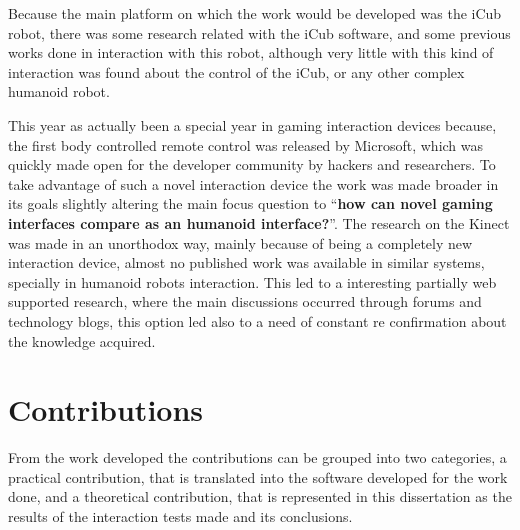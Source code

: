 	Because the main platform on which the work would be developed was the iCub robot, there was some research related with the iCub software, and some previous works done in interaction with this robot, although very little with this kind of interaction was found about the control of the iCub, or any other complex humanoid robot.

	This year as actually been a special year in gaming interaction devices because, the first body controlled remote control was released by Microsoft, which was quickly made open for the developer community by hackers and researchers. To take advantage of such a novel interaction device the work was made broader in its goals slightly altering the main focus question to ``\textbf{how can novel gaming interfaces compare as an humanoid interface?}''. The research on the Kinect was made in an unorthodox way, mainly because of being a completely new interaction device, almost no published work was available in similar systems, specially in humanoid robots interaction. This led to a interesting partially web supported research, where the main discussions occurred through forums and technology blogs, this option led also to a need of constant re confirmation about the knowledge acquired.

\section{Contributions}

	From the work developed the contributions can be grouped into two categories, a practical contribution, that is translated into the software developed for the work done, and a theoretical contribution, that is represented in this dissertation as the results of the interaction tests made and its conclusions.
	
